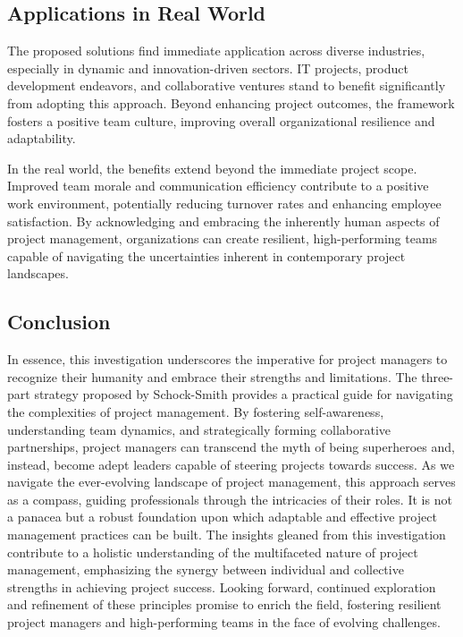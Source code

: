 \documentclass[11pt]{article}
\begin{document}
\subsection{Applications in Real World}
The proposed solutions find immediate application across diverse industries, especially in dynamic and innovation-driven sectors. IT projects, product development endeavors, and collaborative ventures stand to benefit significantly from adopting this approach. Beyond enhancing project outcomes, the framework fosters a positive team culture, improving overall organizational resilience and adaptability.

In the real world, the benefits extend beyond the immediate project scope. Improved team morale and communication efficiency contribute to a positive work environment, potentially reducing turnover rates and enhancing employee satisfaction. By acknowledging and embracing the inherently human aspects of project management, organizations can create resilient, high-performing teams capable of navigating the uncertainties inherent in contemporary project landscapes.

\subsection{Conclusion}
In essence, this investigation underscores the imperative for project managers to recognize their humanity and embrace their strengths and limitations. The three-part strategy proposed by Schock-Smith provides a practical guide for navigating the complexities of project management. By fostering self-awareness, understanding team dynamics, and strategically forming collaborative partnerships, project managers can transcend the myth of being superheroes and, instead, become adept leaders capable of steering projects towards success.
As we navigate the ever-evolving landscape of project management, this approach serves as a compass, guiding professionals through the intricacies of their roles. It is not a panacea but a robust foundation upon which adaptable and effective project management practices can be built. The insights gleaned from this investigation contribute to a holistic understanding of the multifaceted nature of project management, emphasizing the synergy between individual and collective strengths in achieving project success. Looking forward, continued exploration and refinement of these principles promise to enrich the field, fostering resilient project managers and high-performing teams in the face of evolving challenges.
\end{document}
